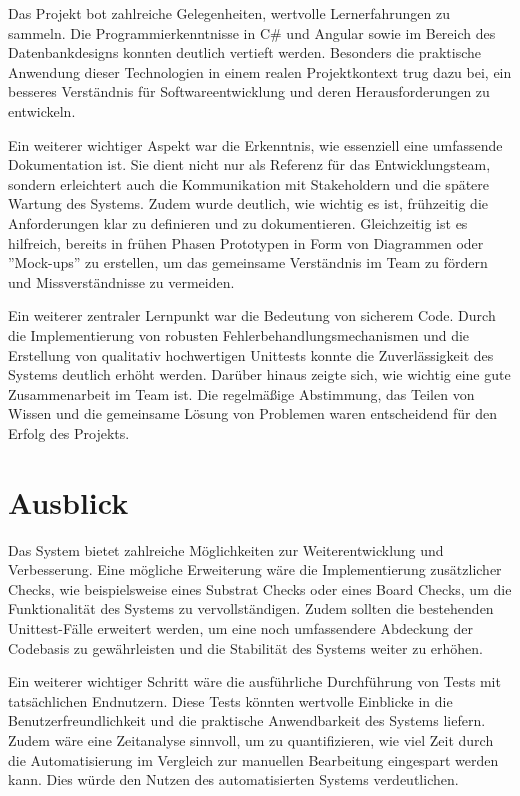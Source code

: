 Das Projekt bot zahlreiche Gelegenheiten, wertvolle Lernerfahrungen zu sammeln. Die Programmierkenntnisse in C\# und Angular sowie im Bereich des Datenbankdesigns konnten deutlich vertieft werden. Besonders die praktische Anwendung dieser Technologien in einem realen Projektkontext trug dazu bei, ein besseres Verständnis für Softwareentwicklung und deren Herausforderungen zu entwickeln.

Ein weiterer wichtiger Aspekt war die Erkenntnis, wie essenziell eine umfassende Dokumentation ist. Sie dient nicht nur als Referenz für das Entwicklungsteam, sondern erleichtert auch die Kommunikation mit Stakeholdern und die spätere Wartung des Systems. Zudem wurde deutlich, wie wichtig es ist, frühzeitig die Anforderungen klar zu definieren und zu dokumentieren. Gleichzeitig ist es hilfreich, bereits in frühen Phasen Prototypen in Form von Diagrammen oder ''Mock-ups'' zu erstellen, um das gemeinsame Verständnis im Team zu fördern und Missverständnisse zu vermeiden.

Ein weiterer zentraler Lernpunkt war die Bedeutung von sicherem Code. Durch die Implementierung von robusten Fehlerbehandlungsmechanismen und die Erstellung von qualitativ hochwertigen Unittests konnte die Zuverlässigkeit des Systems deutlich erhöht werden.  Darüber hinaus zeigte sich, wie wichtig eine gute Zusammenarbeit im Team ist. Die regelmäßige Abstimmung, das Teilen von Wissen und die gemeinsame Lösung von Problemen waren entscheidend für den Erfolg des Projekts.

\section{Ausblick}

Das System bietet zahlreiche Möglichkeiten zur Weiterentwicklung und Verbesserung. Eine mögliche Erweiterung wäre die Implementierung zusätzlicher Checks, wie beispielsweise eines Substrat Checks oder eines Board Checks, um die Funktionalität des Systems zu vervollständigen. Zudem sollten die bestehenden Unittest-Fälle erweitert werden, um eine noch umfassendere Abdeckung der Codebasis zu gewährleisten und die Stabilität des Systems weiter zu erhöhen.

Ein weiterer wichtiger Schritt wäre die ausführliche Durchführung von Tests mit tatsächlichen Endnutzern. Diese Tests könnten wertvolle Einblicke in die Benutzerfreundlichkeit und die praktische Anwendbarkeit des Systems liefern. Zudem wäre eine Zeitanalyse sinnvoll, um zu quantifizieren, wie viel Zeit durch die Automatisierung im Vergleich zur manuellen Bearbeitung eingespart werden kann. Dies würde den Nutzen des automatisierten Systems verdeutlichen. 

